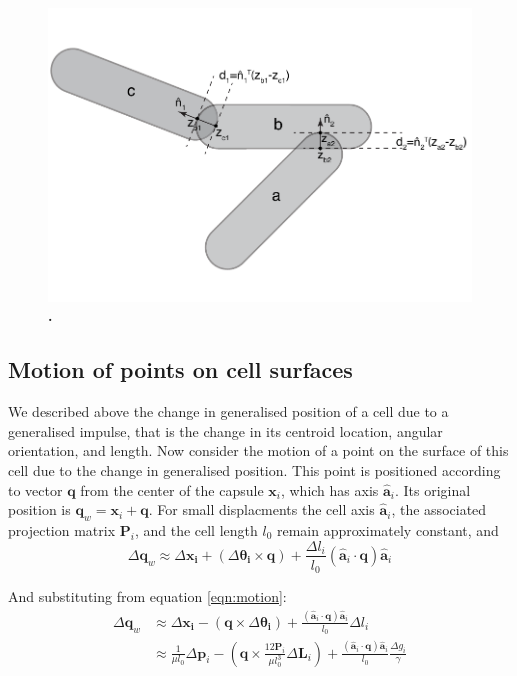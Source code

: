 \documentclass{report}
\let\oldhat\hat
\renewcommand{\vec}[1]{\mathbf{#1}}
\renewcommand{\hat}[1]{\oldhat{\mathbf{#1}}}
\let\oldcaption\caption
\renewcommand{\caption}[2][]{\oldcaption[#1]{\textbf{#1.} #2}}
\newcommand{\mat}{\mathbf}
\newcommand{\deltap}{\Delta \vec{p}}
\newcommand{\deltaL}{\Delta \vec{L}}
\newcommand{\deltag}{\Delta g}
\begin{document}
\begin{center}
\begin{figure}[p]\centering
\includegraphics[scale=0.75]{celloverlap}
\caption{}
\label{fig:overlap}
\end{figure}
\end{center}

\subsection{Motion of points on cell surfaces}
We described above the change in generalised position of a cell due to a
generalised impulse, that is the change in its centroid location, angular
orientation, and length. Now consider the motion of a point on the
surface of this cell due to the change in generalised position. This point is
positioned according to vector $\vec{q}$ from the center
of the capsule $\vec{x}_i$, which has axis $\hat{\vec{a}}_i$.  Its original position is
$\vec{q}_w = \vec{x}_i + \vec{q}$.
For small displacments the cell axis $\hat{\vec{a}}_i$, the associated
projection matrix $\mat{P}_i$, and the cell length $l_0$ remain approximately constant, and
\[
\Delta \vec{q}_w \approx
\Delta \vec{ x_i} +
(\Delta \vec{\theta_i}\times\vec{q}) +
\frac{\Delta l_i}{l_0} \left(\hat{a}_i\cdot\vec{q}\right)\hat{a}_i
\]

And substituting from equation \ref{eqn:motion}:
\begin{align*}
\Delta \vec{ q}_w &\approx
\Delta \vec{ x_i} -
(\vec{q} \times \Delta \vec{\theta_i}) +
\frac{\left(\hat{a}_i\cdot\vec{q}\right)\hat{a}_i}{l_0} \Delta l_i \\
&\approx
\frac{1}{\mu l_0} \deltap_i -
(\vec{q} \times \frac{12\mat{P}_i}{\mu l_0^3}\deltaL_i) +
\frac{\left(\hat{a}_i\cdot\vec{q}\right)\hat{a}_i}{l_0}\frac{\deltag_i}{\gamma}
\end{align*}
\end{document}
